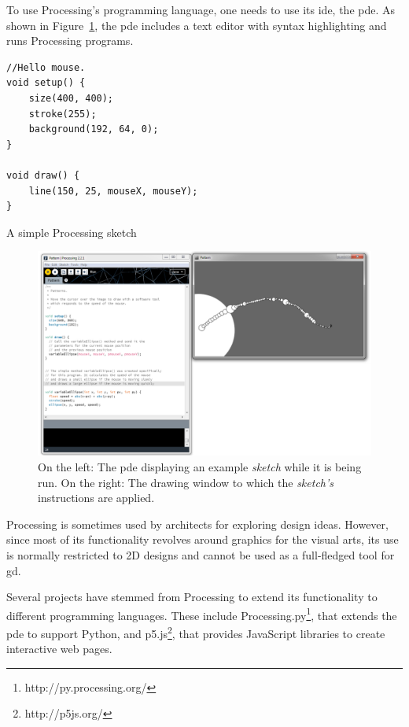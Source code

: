 To use Processing's programming language, one needs to use its \gls{ide}, the \acrfull{pde}.
As shown in Figure~\ref{fig:proc:dev:env}, the \gls{pde} includes a text editor with syntax highlighting and runs Processing programs.

\begin{listing}
\begin{verbatim}
//Hello mouse.
void setup() {
	size(400, 400);
	stroke(255);
	background(192, 64, 0);
}

void draw() {
	line(150, 25, mouseX, mouseY);
}
\end{verbatim}
	\caption[A simple Processing sketch]{A simple Processing sketch}
	\label{lst:simple:processing}
\end{listing}

\begin{figure}
	\centering
	\includegraphics[width=1.0\textwidth]{images/proc_dev_env}
	\caption{On the left: The \gls{pde} displaying an example \emph{sketch} while it is being run. On the right: The drawing window to which the \emph{sketch's} instructions are applied.}
	\label{fig:proc:dev:env}
\end{figure}

Processing is sometimes used by architects for exploring design ideas.
However, since most of its functionality revolves around graphics for the visual arts, its use is normally restricted to 2D designs and cannot be used as a full-fledged tool for \gls{gd}.

Several projects have stemmed from Processing to extend its functionality to different programming languages.
These include Processing.py\footnote{http://py.processing.org/}, that extends the \gls{pde} to support Python, and p5.js\footnote{http://p5js.org/}, that provides JavaScript libraries to create interactive web pages.


